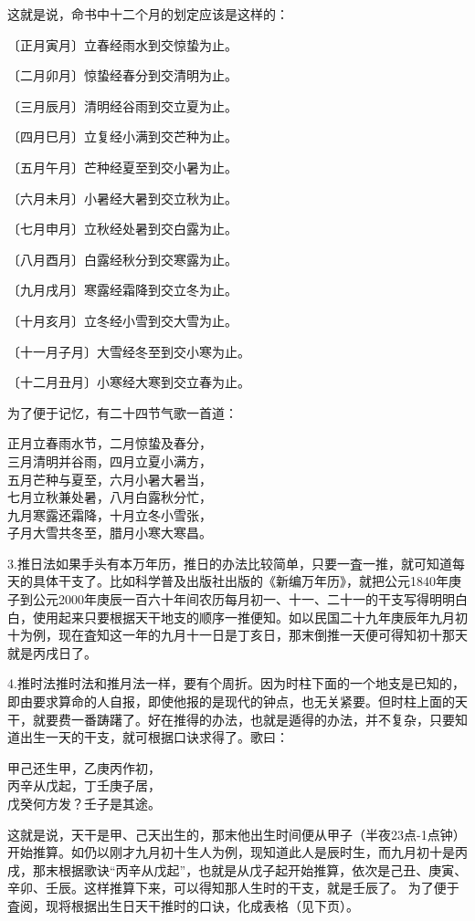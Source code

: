 \documentclass[a5paper,oneside,12pt]{ctexbook}
\newcommand*{\circled}[1]{\ifthenelse{#1 > 10}{\lower.7ex\hbox{\tikz\draw (0pt, 0pt) circle (.5em) node {\makebox[1em][c]{\footnotesize #1}};}}{\lower.7ex\hbox{\tikz\draw (0pt, 0pt) circle (.5em) node {\makebox[1em][c]{\small #1}};}}}
\newenvironment{tightcenter}{%
  \setlength\topsep{0pt}
  \setlength\parskip{0pt}
  \begin{center}\kaishu 
}{%
  \end{center}
}
\begin{document}
这就是说，命书中十二个月的划定应该是这样的：
\begin{enumerate}[label=\circled{\arabic*},parsep=0pt,topsep=0pt,itemsep=0pt,itemindent=2em]
\item 〔正月寅月〕立春经雨水到交惊蛰为止。
\item 〔二月卯月〕惊蛰经春分到交清明为止。
\item 〔三月辰月〕清明经谷雨到交立夏为止。
\item 〔四月巳月〕立复经小满到交芒种为止。
\item 〔五月午月〕芒种经夏至到交小暑为止。
\item 〔六月未月〕小暑经大暑到交立秋为止。
\item 〔七月申月〕立秋经处暑到交白露为止。
\item 〔八月酉月〕白露经秋分到交寒露为止。
\item 〔九月戌月〕寒露经霜降到交立冬为止。
\item 〔十月亥月〕立冬经小雪到交大雪为止。
\item 〔十一月子月〕大雪经冬至到交小寒为止。
\item 〔十二月丑月〕小寒经大寒到交立春为止。
\end{enumerate}

为了便于记忆，有二十四节气歌一首道：
\begin{tightcenter}
正月立春雨水节，二月惊蛰及春分，\\
三月清明并谷雨，四月立夏小满方，\\
五月芒种与夏至，六月小暑大暑当，\\
七月立秋兼处暑，八月白露秋分忙，\\
九月寒露还霜降，十月立冬小雪张，\\
子月大雪共冬至，腊月小寒大寒昌。\\
\end{tightcenter}

3.推日法\quad{}如果手头有本万年历，推日的办法比较简单，只要一査一推，就可知道每天的具体干支了。比如科学普及出版社出版的《新编万年历》，就把公元1840年庚子到公元2000年庚辰一百六十年间农历每月初一、十一、二十一的干支写得明明白白，使用起来只要根据天干地支的顺序一推便知。如以民国二十九年庚辰年九月初十为例，现在査知这一年的九月十一日是丁亥日，那末倒推一天便可得知初十那天就是丙戌日了。

4.推时法\quad{}推时法和推月法一样，要有个周折。因为时柱下面的一个地支是已知的，即由要求算命的人自报，即使他报的是现代的钟点，也无关紧要。但时柱上面的天干，就要费一番踌躇了。好在推得的办法，也就是遁得的办法，并不复杂，只要知道出生一天的干支，就可根据口诀求得了。歌曰：
\begin{tightcenter}
甲己还生甲，乙庚丙作初，\\
丙辛从戊起，丁壬庚子居，\\
戊癸何方发？壬子是其途。\\
\end{tightcenter}
这就是说，天干是甲、己天出生的，那末他出生时间便从甲子（半夜23点-1点钟）开始推算。如仍以刚才九月初十生人为例，现知道此人是辰时生，而九月初十是丙戌，那末根据歌诀“丙辛从戊起”，也就是从戊子起开始推算，依次是己丑、庚寅、辛卯、壬辰。这样推算下来，可以得知那人生时的干支，就是壬辰了。
为了便于査阅，现将根据出生日天干推时的口诀，化成表格（见下页）。
\end{document}
